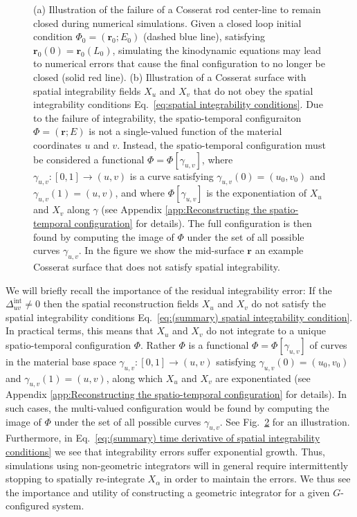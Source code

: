 \begin{figure}
\begin{subfigure}[b]{0.47\textwidth}
        \caption[]%
        {}    
        \label{fig:surface spatial integrability err}
    \end{subfigure}
    \caption[ ]
    {\small (a) Illustration of the failure of a Cosserat rod center-line to remain closed during numerical simulations. Given a closed loop initial condition $\Phi_0 = (\mathbf{r}_0 ; E_0)$ (dashed blue line), satisfying $\mathbf{r}_0(0) = \mathbf{r}_0(L_0)$, simulating the kinodynamic equations may lead to numerical errors that cause the final configuration to no longer be closed (solid red line). (b) Illustration of a Cosserat surface with spatial integrability fields $X_u$ and $X_v$ that do not obey the spatial integrability conditions Eq.~\ref{eq:spatial integrability conditions}. Due to the failure of integrability, the spatio-temporal configuraiton $\Phi = (\mathbf{r} ; E)$ is not a single-valued function of the material coordinates $u$ and $v$. Instead, the spatio-temporal configuration must be considered a functional $\Phi = \Phi[\gamma_{u,v}]$, where $\gamma_{u,v} : [0,1] \to (u,v)$ is a curve satisfying $\gamma_{u,v}(0) = (u_0, v_0)$ and $\gamma_{u,v}(1) = (u,v)$, and where $\Phi[\gamma_{u,v}]$ is the exponentiation of $X_u$ and $X_v$ along $\gamma$  (see Appendix \ref{app:Reconstructing the spatio-temporal configuration} for details). The full configuration is then found by computing the image of $\Phi$ under the set of all possible curves $\gamma_{u,v}$. In the figure we show the mid-surface $\mathbf{r}$ an example Cosserat surface that does not satisfy spatial integrability.}
\end{figure} 

 We will briefly recall the importance of the residual integrability error: If the $\Delta^\text{int}_{u v} \neq 0$ then the spatial reconstruction fields $X_u$ and $X_v$ do not satisfy the spatial integrability conditions Eq.~\ref{eq:(summary) spatial integrability condition}. In practical terms, this means that $X_u$ and $X_v$ do not integrate to a unique spatio-temporal configuration $\Phi$. Rather $\Phi$ is a functional $\Phi = \Phi[\gamma_{u,v}]$ of curves in the material base space $\gamma_{u,v} : [0,1] \to (u,v)$ satisfying $\gamma_{u,v}(0) = (u_0, v_0)$ and $\gamma_{u,v}(1) = (u,v)$, along which $X_u$ and $X_v$ are exponentiated (see Appendix \ref{app:Reconstructing the spatio-temporal configuration} for details). In such cases, the multi-valued configuration would be found by computing the image of $\Phi$ under the set of all possible curves $\gamma_{u,v}$. See Fig.~\ref{fig:surface spatial integrability err} for an illustration. Furthermore, in Eq.~\ref{eq:(summary) time derivative of spatial integrability conditions} we see that integrability errors suffer exponential growth. Thus, simulations using non-geometric integrators will in general require intermittently stopping to spatially re-integrate $X_\alpha$ in order to maintain the errors. We thus see the importance and utility of constructing a geometric integrator for a given $G$-configured system.
 

